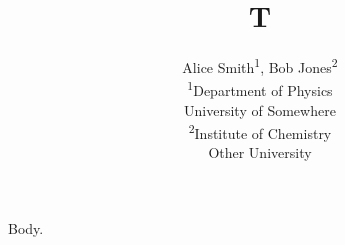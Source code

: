 \documentclass{article}
\begin{document}
\title{T}
\author{Alice Smith\textsuperscript{1}, Bob Jones\textsuperscript{2}\\
  \textsuperscript{1}Department of Physics\\ University of Somewhere\\
  \textsuperscript{2}Institute of Chemistry\\ Other University}
\maketitle
Body.
\end{document}
